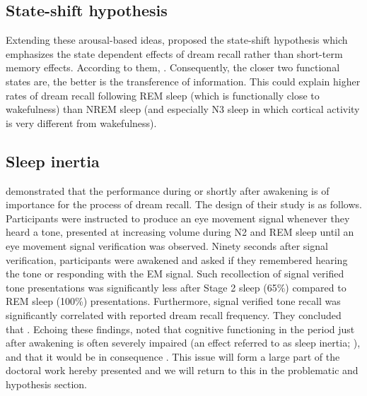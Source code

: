 \subsection{State-shift hypothesis}
\label{sec:dream-recall:theories:state}

Extending these arousal-based ideas, \citet{koukkou_dreaming:_1983} proposed the state-shift hypothesis which emphasizes the state dependent effects of dream recall rather than short-term memory effects. According to them,  \citep{koukkou_dreaming:_1983}. Consequently, the closer two functional states are, the better is the transference of information. This could explain higher rates of dream recall following REM sleep (which is functionally close to wakefulness) than NREM sleep (and especially N3 sleep in which cortical activity is very different from wakefulness).

\subsection{Sleep inertia}
\label{sec:dream-recall:theories:inertia}

\citet{conduit_poor_2004} demonstrated that the performance during or shortly after awakening is of importance for the process of dream recall. The design of their study is as follows. Participants were instructed to produce an eye movement signal whenever they heard a tone, presented at increasing volume during N2 and REM sleep until an eye movement signal verification was observed.  Ninety seconds after signal verification, participants were awakened and asked if they remembered hearing the tone or responding with the EM signal. Such recollection of signal verified tone presentations was significantly less after Stage 2 sleep (65\%) compared to REM sleep (100\%) presentations. Furthermore, signal verified tone recall was significantly correlated with reported dream recall frequency. They concluded that  \citep{conduit_poor_2004}.
Echoing these findings, \citet{schredl_factors_2003} noted that cognitive functioning in the period just after awakening is often severely impaired (an effect referred to as sleep inertia; \citealp{tassi_sleep_2000, trotti_waking_2016}), and that it would be in consequence . This issue will form a large part of the doctoral work hereby presented and we will return to this in the problematic and hypothesis section.


